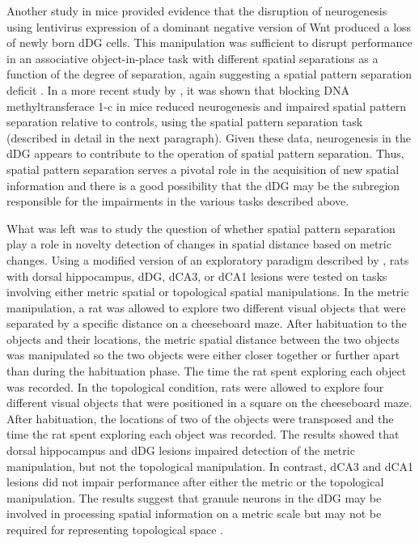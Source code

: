 \documentclass[doc, longtable]{apa6}
\begin{document}
Another study in mice provided evidence that the disruption of neurogenesis using lentivirus expression of a dominant negative version of Wnt produced a loss of newly born dDG cells.  This manipulation was sufficient to disrupt performance in an associative object-in-place task with different spatial separations as a function of the degree of separation, again suggesting a spatial pattern separation deficit \parencite{Clelland2009a}. In a more recent study by \textcite{kesner2014role}, it was shown that blocking DNA methyltransferace 1-c in mice reduced neurogenesis and impaired spatial pattern separation relative to controls, using the \textcite{Goodrich-Hunsaker2005a} spatial pattern separation task (described in detail in the next paragraph). Given these data, neurogenesis in the dDG appears to  contribute to the operation of spatial pattern separation. Thus, spatial pattern separation serves a pivotal role in the acquisition of new spatial information and there is a good possibility that the dDG may be the subregion responsible for the impairments in the various tasks described above.

What was left was to study the question of whether spatial pattern separation play a role in novelty detection of changes in spatial distance based on metric changes. Using a modified version of an exploratory paradigm described by \textcite{Poucet1989a}, rats with dorsal hippocampus, dDG, dCA3, or dCA1 lesions were tested on tasks involving either metric spatial or topological spatial manipulations. In the metric manipulation, a rat was allowed to explore two different visual objects that were separated by a specific distance on a cheeseboard maze. After habituation to the objects and their locations, the metric spatial distance between the two objects was manipulated so the two objects were either closer together or further apart than during the habituation phase. The time the rat spent exploring each object was recorded. In the topological condition, rats were allowed to explore four different visual objects that were positioned in a square on the cheeseboard maze. After habituation, the locations of two of the objects were transposed and the time the rat spent exploring each object was recorded. The results showed that dorsal hippocampus and dDG lesions impaired detection of the metric manipulation, but not the topological manipulation. In contrast, dCA3 and dCA1 lesions did not impair performance after either the metric or the topological manipulation. The results suggest that granule neurons in the dDG may be involved in processing spatial information on a metric scale but may not be required for representing topological space \parencite{goodrich2008interactions, Goodrich-Hunsaker2005a}.
\end{document}
